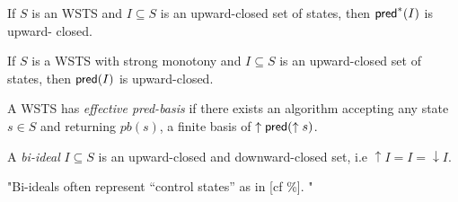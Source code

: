 
\begin{proposition}\cite{DBLP:journals/tcs/FinkelS01}
If $S$ is an WSTS and $I \subseteq S$ is an upward-closed set of states, then $\textsf{pred}^*(I )$ is upward-
closed.
\end{proposition}

\iffalse
Proof. Assume $s \in \pred^* (I )$. Then $s \rightarrow^* t$ for some $t \in I $. If now $s' \geq s$ then upward-compatibility entails that $s' \rightarrow^* t'$ for some $t' \geq t$. Then $t' \in I$ and $s' \in \pred^*(I )$.
\fi

\begin{proposition}\cite{DBLP:journals/tcs/FinkelS01}
If $S$ is a WSTS with strong monotony and $I \subseteq S$ is an upward-closed set of states, then $\textsf{pred}(I )$ is upward-closed.
\end{proposition}
\iffalse
Proof. Assume $s \in \pred (I )$. Then $s \rightarrow t$ for some $t \in I $. If now $s' \geq s$ then strong upward-compatibility entails that $s' \rightarrow t'$ for some $t' \geq t$. Then $t' \in I$ and $s' \in \pred(I )$.
\fi




\begin{definition}\cite{DBLP:journals/iandc/AbdullaCJT00}
A WSTS has {\em effective pred-basis} if there exists an algorithm accepting
any state $s \in S$ and returning $pb(s)$, a finite basis of $\uparrow \textsf{pred}(\uparrow s)$.
\end{definition}



\iffalse
\begin{definition}
A {\em bi-ideal} $I \subseteq S$ is an upward-closed and downward-closed set, i.e
$\uparrow I = I = \downarrow I$.
\end{definition}

"Bi-ideals often represent “control states” as in [cf \%]. "

